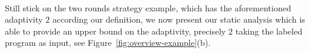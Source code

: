 \paragraph{}
Still stick on the two rounds strategy example, which has the aforementioned adaptivity $2$ according our definition, 
we now present our static analysis which is able to provide an upper bound on the adaptivity, precisely $2$ taking the labeled program as input, see Figure~\ref{fig:overview-example}(b).


